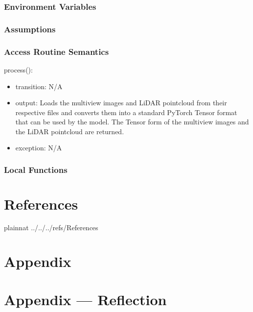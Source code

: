 \documentclass[12pt, titlepage]{article}
\begin{document}
\subsubsection{Environment Variables}



\subsubsection{Assumptions}

\newpage



\subsubsection{Access Routine Semantics}
\noindent process():
\begin{itemize}
\item transition: N/A 
\item output: Loads the multiview images and LiDAR pointcloud from their respective files and converts them into a standard PyTorch Tensor format that can be used by the model. The Tensor form of the multiview images and the LiDAR pointcloud are returned.
\item exception: N/A
\end{itemize}

\subsubsection{Local Functions}


\section{References}
\newpage

 {plainnat}
 {../../../refs/References}

\newpage




\section{Appendix} \label{Appendix}


\newpage{}

\section*{Appendix --- Reflection}
\end{document}
